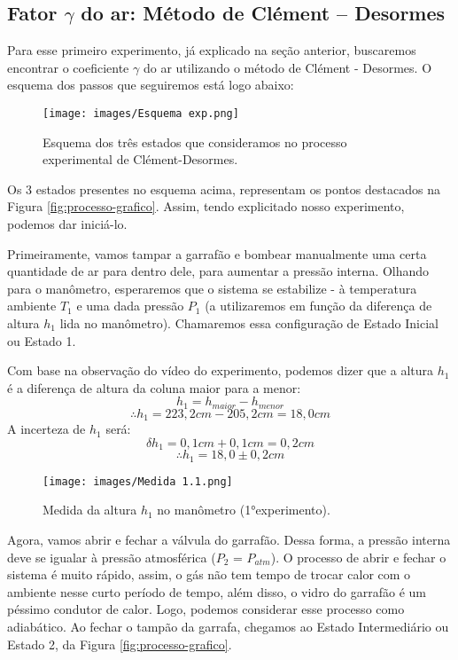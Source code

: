 \subsection{Fator $\gamma$ do ar: Método de Clément – Desormes}

Para esse primeiro experimento, já explicado na seção anterior, buscaremos encontrar o coeficiente $\gamma$ do ar utilizando o método de Clément -  Desormes. O esquema dos passos que seguiremos está logo abaixo:

\begin{figure}[H]
  \centering
  \texttt{[image: images/Esquema exp.png]}
  \caption{Esquema dos três estados que consideramos no processo experimental de Clément-Desormes.}
\end{figure}

Os 3 estados presentes no esquema acima, representam os pontos destacados na Figura \ref{fig:processo-grafico}. Assim, tendo explicitado nosso experimento, podemos dar iniciá-lo.

Primeiramente, vamos tampar a garrafão e bombear manualmente uma certa quantidade de ar para dentro dele, para aumentar a pressão interna. Olhando para o manômetro, esperaremos que o sistema se estabilize - à temperatura ambiente $T_1$ e uma dada pressão $P_1$ (a utilizaremos em função da diferença de altura $h_1$ lida no manômetro).
Chamaremos essa configuração de Estado Inicial ou Estado 1.

Com base na observação do vídeo do experimento, podemos dizer que a altura $h_1$ é a diferença de altura da coluna maior para a menor:\ 
\ \[h_1 = h_{maior} - h_{menor} \]
\[\therefore h_1 = 223,2 cm - 205,2 cm  =  18,0 cm\]
A incerteza de $h_1$ será:\\
\[\delta h_1 = 0,1 cm + 0,1 cm =  0,2 cm\]
\[\therefore h_1 = 18,0 \pm 0,2 cm\]


\begin{figure}[H]
  \centering
  \texttt{[image: images/Medida 1.1.png]}
  \caption{Medida da altura $h_1$ no manômetro (1°experimento).}
\end{figure}

Agora, vamos abrir e fechar a válvula do garrafão. Dessa forma, a pressão interna deve se igualar à pressão atmosférica ($P_2$ = $P_{atm}$). O processo de abrir e fechar o sistema é muito rápido, assim, o gás não tem tempo de trocar calor com o ambiente nesse curto período de tempo, além disso, o vidro do garrafão é um péssimo condutor de calor. Logo, podemos considerar esse processo como adiabático. Ao fechar o tampão da garrafa, chegamos ao Estado Intermediário ou Estado 2, da Figura \ref{fig:processo-grafico}.\\

